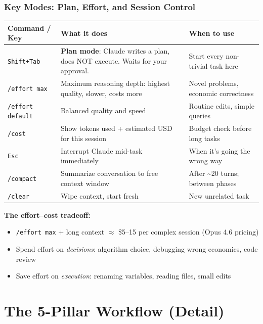 \documentclass[10pt,english,aspectratio=169]{beamer}
\begin{document}
\begin{frame}
\frametitle{Key Modes: Plan, Effort, and Session Control}

\begin{center}
\footnotesize
\begin{tabular}{|l|p{5.0cm}|p{3.3cm}|}
\hline
\textbf{Command / Key} & \textbf{What it does} & \textbf{When to use} \\ \hline
\texttt{Shift+Tab} & \textbf{Plan mode}: Claude writes a plan, does NOT execute. Waits for your approval. & Start every non-trivial task here \\ \hline
\texttt{/effort max} & Maximum reasoning depth: highest quality, slower, costs more & Novel problems, economic correctness \\ \hline
\texttt{/effort default} & Balanced quality and speed & Routine edits, simple queries \\ \hline
\texttt{/cost} & Show tokens used + estimated USD for this session & Budget check before long tasks \\ \hline
\texttt{Esc} & Interrupt Claude mid-task immediately & When it's going the wrong way \\ \hline
\texttt{/compact} & Summarize conversation to free context window & After \textasciitilde{}20 turns; between phases \\ \hline
\texttt{/clear} & Wipe context, start fresh & New unrelated task \\ \hline
\end{tabular}
\end{center}

\vspace{0.2cm}

\textbf{The effort--cost tradeoff:}
\begin{itemize}
    \item \texttt{/effort max} + long context $\approx$ \$5--15 per complex session (Opus 4.6 pricing)
    \item Spend effort on \textit{decisions}: algorithm choice, debugging wrong economics, code review
    \item Save effort on \textit{execution}: renaming variables, reading files, small edits
\end{itemize}
\end{frame}

\section{The 5-Pillar Workflow (Detail)}
\end{document}
